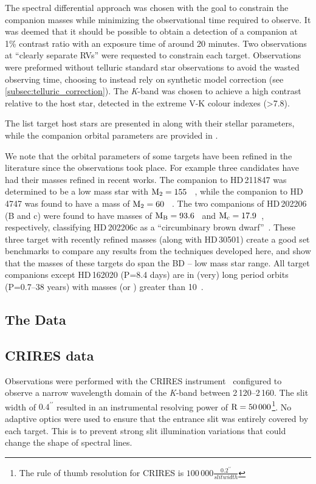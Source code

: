 The spectral differential approach was chosen with the goal to constrain the companion masses while minimizing the observational time required to observe. It was deemed that it should be possible to obtain a detection of a companion at 1\% contrast ratio with an exposure time of around 20 minutes. Two observations at ``clearly separate RVs'' were requested to constrain each target. Observations were preformed without telluric standard star observations to avoid the wasted observing time, choosing to instead rely on synthetic model correction (see \ref{subsec:telluric_correction}). The \textit{K}-band was chosen to achieve a high contrast relative to the host star, detected in the extreme V-K colour indexes (>7.8).

The list target host stars are presented in  along with their stellar parameters, while the companion orbital parameters are provided in .

We note that the orbital parameters of some targets have been refined in the literature since the observations took place. For example three candidates have had their masses refined in recent works. The companion to {HD\,211847} was determined to be a low mass star with \(\rm M_2=155~\)\Mjup{}~\citep{moutou_eccentricity_2017}, while the companion to {HD\,4747} was found to have a mass of \(\rm M_2=60~\)\Mjup{}~\citep{crepp_trends_2016}. The two companions of {HD\,202206} (B and c) were found to have masses of \(\rm M_B =93.6\)~\Mjup{} and \(\rm M_c = 17.9\)~\Mjup{}, respectively, classifying {HD\,202206}c as a ``circumbinary brown dwarf''~\citep{benedict_hd_2017}. These three target with recently refined masses (along with {HD\,30501}) create a good set benchmarks to compare any results from the techniques developed here, and show that the masses of these targets do span the BD -- low mass star range. All target companions except {HD\,162020} (P=8.4 days) are in (very) long period orbits (P=0.7--38 years) with masses (or \mtwosini{}) greater than 10~\Mjup{}.




\subsection{The Data}

\subsection{CRIRES data}
\label{subsec:CRIRES}
Observations were performed with the {CRIRES} instrument~\citep{kaeufl_crires_2004} configured to observe a narrow wavelength domain of the \emph{K}-band between 2\,120--2\,160\nm{}. The slit width of \(0.4^{\prime\prime}\) resulted in an instrumental resolving power of \(\textrm{R}=50\,000\)\footnote{The rule of thumb resolution for {CRIRES} is \(100\,000\frac{0.2^{\prime\prime}}{slit width}\)}. No adaptive optics were used to ensure that the entrance slit was entirely covered by each target. This is to prevent strong slit illumination variations that could change the shape of spectral lines.

